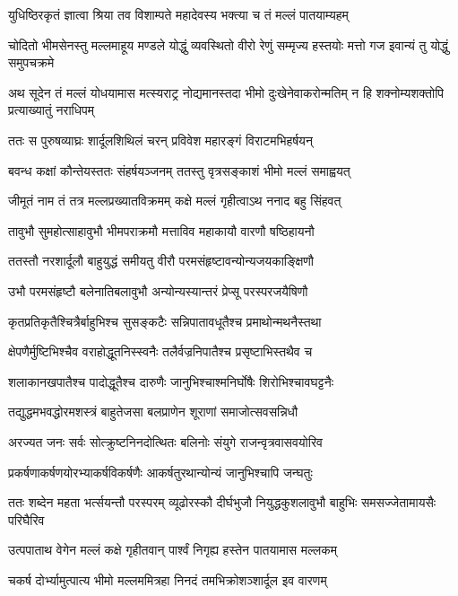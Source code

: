 \twolineshloka
{युधिष्ठिरकृतं ज्ञात्वा श्रिया तव विशाम्पते}
{महादेवस्य भक्त्या च तं मल्लं पातयाम्यहम्}



\threelineshloka
{चोदितो भीमसेनस्तु मल्लमाहूय मण्डले}
{योद्धुं व्यवस्थितो वीरो रेणुं सम्मृज्य हस्तयोः}
{मत्तो गज इवान्यं तु योद्धुं समुपचक्रमे}


\onelineshloka
{अथ सूदेन तं मल्लं योधयामास मत्स्यराट्र}
\twolineshloka
{नोद्यमानस्तदा भीमो दुःखेनेवाकरोन्मतिम्}
{न हि शक्नोम्यशक्तोपि प्रत्याख्यातुं नराधिपम्}


\twolineshloka
{ततः स पुरुषव्याघ्रः शार्दूलशिथिलं चरन्}
{प्रविवेश महारङ्गं विराटमभिहर्षयन्}


\twolineshloka
{बवन्ध कक्षां कौन्तेयस्ततः संहर्षयञ्जनम्}
{ततस्तु वृत्रसङ्काशं भीमो मल्लं समाह्वयत्}


\twolineshloka
{जीमूतं नाम तं तत्र मल्लप्रख्यातविक्रमम्}
{कक्षे मल्लं गृहीत्वाऽथ ननाद बहु सिंहवत्}


\twolineshloka
{तावुभौ सुमहोत्साहावुभौ भीमपराक्रमौ}
{मत्ताविव महाकायौ वारणौ षष्ठिहायनौ}


\twolineshloka
{ततस्तौ नरशार्दूलौ बाहुयुद्धं समीयतु}
{वीरौ परमसंहृष्टावन्योन्यजयकाङ्क्षिणौ}


\twolineshloka
{उभौ परमसंहृष्टौ बलेनातिबलावुभौ}
{अन्योन्यस्यान्तरं प्रेप्सू परस्परजयैषिणौ}


\twolineshloka
{कृतप्रतिकृतैश्चित्रैर्बाहुभिश्च सुसङ्कटैः}
{सन्निपातावधूतैश्च प्रमाथोन्मथनैस्तथा}


\twolineshloka
{क्षेपणैर्मुष्टिभिश्चैव वराहोद्धूतनिस्स्वनैः}
{तलैर्वज्रनिपातैश्च प्रसृष्टाभिस्तथैव च}


\twolineshloka
{शलाकानखपातैश्च पादोद्धूतैश्च दारुणैः}
{जानुभिश्चाश्मनिर्घोषैः शिरोभिश्चावघट्टनैः}


\twolineshloka
{तद्युद्धमभवद्धोरमशस्त्रं बाहुतेजसा}
{बलप्राणेन शूराणां समाजोत्सवसन्निधौ}


\twolineshloka
{अरज्यत जनः सर्वः सोत्क्रुष्टनिनदोत्थितः}
{बलिनोः संयुगे राजन्वृत्रवासवयोरिव}


\twolineshloka
{प्रकर्षणाकर्षणयोरभ्याकर्षविकर्षणैः}
{आकर्षतुरथान्योन्यं जानुभिश्चापि जन्घतुः}


\threelineshloka
{ततः शब्देन महता भर्त्सयन्तौ परस्परम्}
{व्यूढोरस्कौ दीर्घभुजौ नियुद्धकुशलावुभौ}
{बाहुभिः समसज्जेतामायसैः परिघैरिव}


\twolineshloka
{उत्पपाताथ वेगेन मल्लं कक्षे गृहीतवान्}
{पार्श्वं निगृह्य हस्तेन पातयामास मल्लकम्}


\twolineshloka
{चकर्ष दोर्भ्यामुत्पात्य भीमो मल्लममित्रहा}
{निनदं तमभिक्रोशञ्शार्दूल इव वारणम्}


